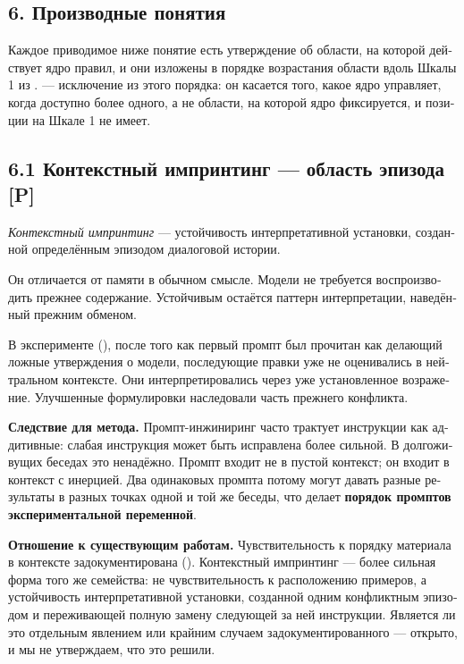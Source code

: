 \begin{russian}
\section*{6. Производные понятия}
\label{sec:ru:6}

Каждое приводимое ниже понятие есть утверждение об области, на которой действует ядро правил, и они изложены в порядке возрастания области вдоль Шкалы 1 из .  — исключение из этого порядка: он касается того, какое ядро управляет, когда доступно более одного, а не области, на которой ядро фиксируется, и позиции на Шкале 1 не имеет.


\subsection*{6.1 Контекстный импринтинг — область эпизода \textbf{[P]}}
\label{sec:ru:6.1}

\emph{Контекстный импринтинг} — устойчивость интерпретативной установки, созданной определённым эпизодом диалоговой истории.

Он отличается от памяти в обычном смысле. Модели не требуется воспроизводить прежнее содержание. Устойчивым остаётся паттерн интерпретации, наведённый прежним обменом.

В эксперименте (), после того как первый промпт был прочитан как делающий ложные утверждения о модели, последующие правки уже не оценивались в нейтральном контексте. Они интерпретировались через уже установленное возражение. Улучшенные формулировки наследовали часть прежнего конфликта.

\textbf{Следствие для метода.} Промпт-инжиниринг часто трактует инструкции как аддитивные: слабая инструкция может быть исправлена более сильной. В долгоживущих беседах это ненадёжно. Промпт входит не в пустой контекст; он входит в контекст с инерцией. Два одинаковых промпта потому могут давать разные результаты в разных точках одной и той же беседы, что делает \textbf{порядок промптов экспериментальной переменной}.

\textbf{Отношение к существующим работам.} Чувствительность к порядку материала в контексте задокументирована (). Контекстный импринтинг — более сильная форма того же семейства: не чувствительность к расположению примеров, а устойчивость интерпретативной установки, созданной одним конфликтным эпизодом и переживающей полную замену следующей за ней инструкции. Является ли это отдельным явлением или крайним случаем задокументированного — открыто, и мы не утверждаем, что это решили.


\end{russian}
